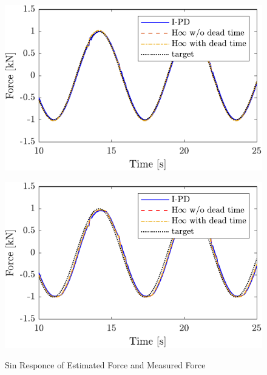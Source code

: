 \begin{figure}[t]
    \begin{minipage}{\minipageratio\hsize}
    \centering
        \includegraphics[keepaspectratio, width = \minifigwidth]{contents/ForceControl/figure/1115/crop-1115_diff_estforce_sin.pdf}
        \label{fig4:crop-1115_diff_estforce_sin}
    \end{minipage}
    \begin{minipage}{\minipageratio\hsize}
    \centering
        \includegraphics[keepaspectratio, width = \minifigwidth]{contents/ForceControl/figure/1115/crop-1115_diff_force_sin.pdf}
        \label{fig4:crop-1115_diff_force_sin}
    \end{minipage}
    \caption{Sin Responce of Estimated Force and Measured Force}
    \label{fig4:crop-1115_diff_sin}
\end{figure}

